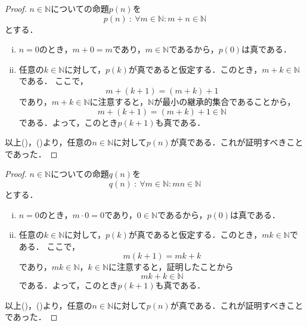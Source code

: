 \begin{tleftbar}
    \begin{proof}
        $n \in \mathbb{N}$についての命題$p(n)$を
        \[
            p(n) ~{:}~ \forall m \in \mathbb{N} \colon  m+n \in \mathbb{N}
        \]
        とする．
        \begin{enumerate}[(i)]
            \item $n=0$のとき，$m+0=m$であり，$m \in \mathbb{N}$であるから，$p(0)$は真である．
            \item 任意の$k \in \mathbb{N}$に対して，$p(k)$が真であると仮定する．このとき，$m+k \in \mathbb{N}$である．
                  ここで，
                  \[
                      m+(k+1)=(m+k)+1
                  \] であり，$m+k \in \mathbb{N}$に注意すると，$\mathbb{N}$が最小の継承的集合であることから，
                  \[
                      m+(k+1)=(m+k)+1  \in \mathbb{N}
                  \]
                  である．よって，このとき$p(k+1)$も真である．
        \end{enumerate}
        以上()，()より，任意の$n \in \mathbb{N}$に対して$p(n)$が真である．これが証明すべきことであった．
    \end{proof}
\end{tleftbar}



\begin{tleftbar}
    \begin{proof}
        $n \in \mathbb{N}$についての命題$q(n)$を
        \[
            q(n) ~{:}~ \forall m \in \mathbb{N} \colon  mn \in \mathbb{N}
        \]
        とする．
        \begin{enumerate}[(i)]
            \item $n=0$のとき，$m \cdot 0=0$であり，$0 \in \mathbb{N}$であるから，$p(0)$は真である．
            \item 任意の$k \in \mathbb{N}$に対して，$p(k)$が真であると仮定する．このとき，$mk \in \mathbb{N}$である．
                  ここで，
                  \[
                      m(k+1)=mk + k
                  \] であり，$mk \in \mathbb{N}$，$k \in \mathbb{N}$に注意すると，証明したことから
                  \[
                      mk + k   \in \mathbb{N}
                  \]
                  である．よって，このとき$p(k+1)$も真である．
        \end{enumerate}
        以上()，()より，任意の$n \in \mathbb{N}$に対して$p(n)$が真である．これが証明すべきことであった．
    \end{proof}
\end{tleftbar}

